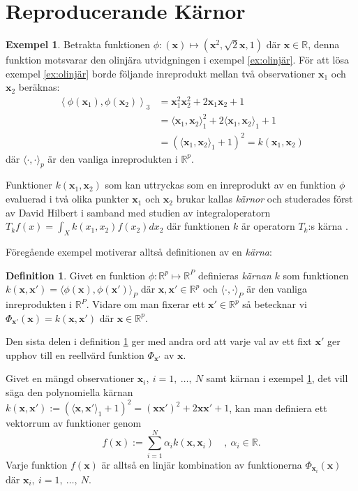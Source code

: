 \documentclass[a4paper, 12pt]{report}
\theoremstyle{definition}
\newtheorem{defi}{Definition}[section]
\newtheorem{ex}{Exempel}[section]
\theoremstyle{remark}
\newcommand{\bfx}{\mathbf{x}}
\begin{document}
\section{Reproducerande Kärnor}
\begin{ex}\label{ex:polynomkärna}
Betrakta funktionen $\phi:\left(\bfx\right)\longmapsto \left(\bfx^2,\sqrt{2}\bfx, 1\right)$ där $\bfx\in\mathbb{R}$, denna funktion motsvarar den olinjära utvidgningen i exempel \ref{ex:olinjär}. För att lösa exempel \ref{ex:olinjär} borde följande inreprodukt mellan två observationer $\mathbf{x}_1$ och $\mathbf{x}_2$ beräknas:
\begin{align*}
	\left\langle \phi\left(\mathbf{x}_1\right), \phi\left(\mathbf{x}_2\right) \right\rangle_3 &= \bfx_1^2\bfx_2^2 + 2\bfx_1\bfx_2 + 1\\
	&= \langle \bfx_1, \bfx_2 \rangle_1^2 + 2\langle \bfx_1, \bfx_2 \rangle_1 + 1\\
	&= \left(\langle\bfx_1, \bfx_2 \rangle_1 + 1\right)^2 = k\left(\bfx_1, \bfx_2\right)
\end{align*}
där $\langle \cdot, \cdot \rangle_p$ är den vanliga inreprodukten i $\mathbb{R}^p$.
\end{ex}

Funktioner $k\left(\bfx_1, \bfx_2\right)$ som kan uttryckas som en inreprodukt av en funktion $\phi$ evaluerad i två olika punkter $\bfx_1$ och $\bfx_2$ brukar kallas \emph{kärnor} och studerades först av David Hilbert \cite{Hilbert} i samband med studien av integraloperatorn $T_k f\left(x\right)=\int_{X}k\left(x_1, x_2\right)f\left(x_2\right)dx_2$ där funktionen $k$ är operatorn $T_k$:s kärna \cite{LearningKernels}.

Föregående exempel motiverar alltså definitionen av en \emph{kärna}:
\begin{defi}\label{def:kärna}
	Givet en funktion $\phi: \mathbb{R}^p \longmapsto \mathbb{R}^P$ definieras \emph{kärnan} $k$ som funktionen $k\left(\bfx, \bfx'\right) = \langle \phi \left(\bfx\right), \phi\left(\bfx'\right) \rangle_P$ där $\bfx, \bfx' \in \mathbb{R}^p$ och $\langle \cdot, \cdot \rangle_P$ är den vanliga inreprodukten i $\mathbb{R}^P$. Vidare om man fixerar ett $\bfx'\in\mathbb{R}^p$ så betecknar vi $\Phi_{\bfx'}\left(\bfx\right) = k\left(\bfx, \bfx'\right)$ där $\bfx\in\mathbb{R}^p$.
\end{defi}
Den sista delen i definition \ref{def:kärna} ger med andra ord att varje val av ett fixt $\bfx'$ ger upphov till en reellvärd funktion $\Phi_{\bfx'}$ av $\bfx$.

Givet en mängd observationer $\bfx_i,~i=1,~\dots,~N$ samt kärnan i exempel \ref{ex:polynomkärna}, det vill säga den polynomiella kärnan $k\left(\bfx, \bfx'\right):=\left(\langle \bfx, \bfx' \rangle_1 + 1\right)^2 = \left(\bfx\bfx'\right)^{2} + 2\bfx\bfx' + 1$, kan man definiera ett vektorrum av funktioner genom
\begin{equation*}
	f\left(\bfx\right):=\sum_{i=1}^{N}\alpha_ik\left(\bfx, \bfx_i\right)\quad ,~\alpha_i\in\mathbb{R}.
\end{equation*}
Varje funktion $f\left(\bfx\right)$ är alltså en linjär kombination av funktionerna $\Phi_{\bfx_i}\left(\bfx\right)$ där $\bfx_i,~i=1,~\dots,~N$. %
\end{document}
